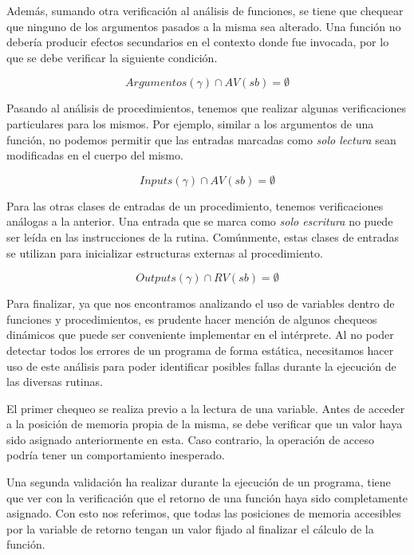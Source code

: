 \documentclass{article}
\begin{document}
Además, sumando otra verificación al análisis de funciones, se tiene que chequear que ninguno de los argumentos pasados a la misma sea alterado.
Una función no debería producir efectos secundarios en el contexto donde fue invocada, por lo que se debe verificar la siguiente condición.

\begin{equation*}
Argumentos(\gamma) \cap AV(sb) = \emptyset
\end{equation*}

Pasando al análisis de procedimientos, tenemos que realizar algunas verificaciones particulares para los mismos.
Por ejemplo, similar a los argumentos de una función, no podemos permitir que las entradas marcadas como \textit{solo lectura} sean modificadas en el cuerpo del mismo.

\begin{equation*}
Inputs(\gamma) \cap AV(sb) = \emptyset
\end{equation*}

Para las otras clases de entradas de un procedimiento, tenemos verificaciones análogas a la anterior.
Una entrada que se marca como \textit{solo escritura} no puede ser leída en las instrucciones de la rutina.
Comúnmente, estas clases de entradas se utilizan para inicializar estructuras externas al procedimiento.

\begin{equation*}
Outputs(\gamma) \cap RV(sb) = \emptyset
\end{equation*}

Para finalizar, ya que nos encontramos analizando el uso de variables dentro de funciones y procedimientos, es prudente hacer mención de algunos chequeos dinámicos que puede ser conveniente implementar en el intérprete.
Al no poder detectar todos los errores de un programa de forma estática, necesitamos hacer uso de este análisis para poder identificar posibles fallas durante la ejecución de las diversas rutinas.

El primer chequeo se realiza previo a la lectura de una variable.
Antes de acceder a la posición de memoria propia de la misma, se debe verificar que un valor haya sido asignado anteriormente en esta.
Caso contrario, la operación de acceso podría tener un comportamiento inesperado.

Una segunda validación ha realizar durante la ejecución de un programa, tiene que ver con la verificación que el retorno de una función haya sido completamente asignado.
Con esto nos referimos, que todas las posiciones de memoria accesibles por la variable de retorno tengan un valor fijado al finalizar el cálculo de la función.
\end{document}
